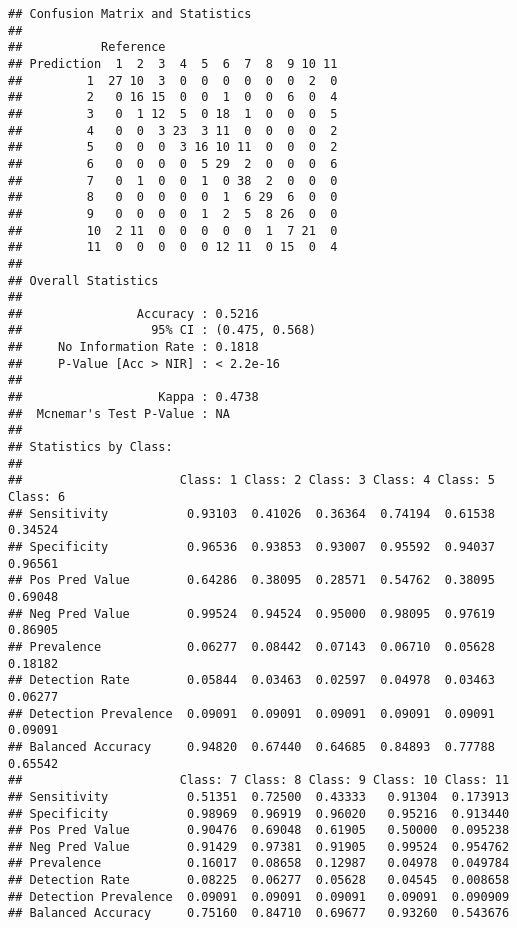 \documentclass[]{article}
\newenvironment{Shaded}{\begin{snugshade}}{\end{snugshade}}
\newcommand{\KeywordTok}[1]{\textcolor[rgb]{0.13,0.29,0.53}{\textbf{#1}}}
\newcommand{\CommentTok}[1]{\textcolor[rgb]{0.56,0.35,0.01}{\textit{#1}}}
\newcommand{\OperatorTok}[1]{\textcolor[rgb]{0.81,0.36,0.00}{\textbf{#1}}}
\newcommand{\NormalTok}[1]{#1}
\begin{document}
\begin{verbatim}
## Confusion Matrix and Statistics
## 
##           Reference
## Prediction  1  2  3  4  5  6  7  8  9 10 11
##         1  27 10  3  0  0  0  0  0  0  2  0
##         2   0 16 15  0  0  1  0  0  6  0  4
##         3   0  1 12  5  0 18  1  0  0  0  5
##         4   0  0  3 23  3 11  0  0  0  0  2
##         5   0  0  0  3 16 10 11  0  0  0  2
##         6   0  0  0  0  5 29  2  0  0  0  6
##         7   0  1  0  0  1  0 38  2  0  0  0
##         8   0  0  0  0  0  1  6 29  6  0  0
##         9   0  0  0  0  1  2  5  8 26  0  0
##         10  2 11  0  0  0  0  0  1  7 21  0
##         11  0  0  0  0  0 12 11  0 15  0  4
## 
## Overall Statistics
##                                         
##                Accuracy : 0.5216        
##                  95% CI : (0.475, 0.568)
##     No Information Rate : 0.1818        
##     P-Value [Acc > NIR] : < 2.2e-16     
##                                         
##                   Kappa : 0.4738        
##  Mcnemar's Test P-Value : NA            
## 
## Statistics by Class:
## 
##                      Class: 1 Class: 2 Class: 3 Class: 4 Class: 5 Class: 6
## Sensitivity           0.93103  0.41026  0.36364  0.74194  0.61538  0.34524
## Specificity           0.96536  0.93853  0.93007  0.95592  0.94037  0.96561
## Pos Pred Value        0.64286  0.38095  0.28571  0.54762  0.38095  0.69048
## Neg Pred Value        0.99524  0.94524  0.95000  0.98095  0.97619  0.86905
## Prevalence            0.06277  0.08442  0.07143  0.06710  0.05628  0.18182
## Detection Rate        0.05844  0.03463  0.02597  0.04978  0.03463  0.06277
## Detection Prevalence  0.09091  0.09091  0.09091  0.09091  0.09091  0.09091
## Balanced Accuracy     0.94820  0.67440  0.64685  0.84893  0.77788  0.65542
##                      Class: 7 Class: 8 Class: 9 Class: 10 Class: 11
## Sensitivity           0.51351  0.72500  0.43333   0.91304  0.173913
## Specificity           0.98969  0.96919  0.96020   0.95216  0.913440
## Pos Pred Value        0.90476  0.69048  0.61905   0.50000  0.095238
## Neg Pred Value        0.91429  0.97381  0.91905   0.99524  0.954762
## Prevalence            0.16017  0.08658  0.12987   0.04978  0.049784
## Detection Rate        0.08225  0.06277  0.05628   0.04545  0.008658
## Detection Prevalence  0.09091  0.09091  0.09091   0.09091  0.090909
## Balanced Accuracy     0.75160  0.84710  0.69677   0.93260  0.543676
\end{verbatim}

\begin{Shaded}
\end{Shaded}
\end{document}
